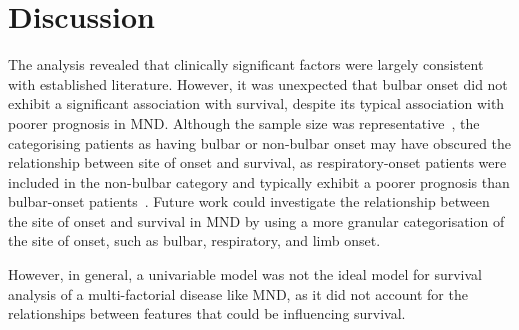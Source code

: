 \section{Discussion}

The analysis revealed that clinically significant factors were largely consistent with established literature.
However, it was unexpected that bulbar onset did not exhibit a significant association with survival, despite its typical association with poorer prognosis in MND.
Although the sample size was representative~\cite{feldmanAmyotrophicLateralSclerosis2022}, the categorising patients as having bulbar or non-bulbar onset may have obscured the relationship between site of onset and survival, as respiratory-onset patients were included in the non-bulbar category and typically exhibit a poorer prognosis than bulbar-onset patients~\cite{suPredictorsSurvivalPatients2021}.
Future work could investigate the relationship between the site of onset and survival in MND by using a more granular categorisation of the site of onset, such as bulbar, respiratory, and limb onset.

However, in general, a univariable model was not the ideal model for survival analysis of a multi-factorial disease like MND, as it did not account for the relationships between features that could be influencing survival.

